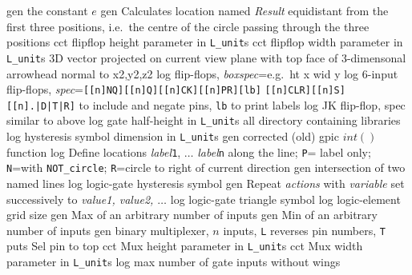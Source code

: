   {gen}
  {the constant $e$}
  {gen}
  {Calculates location named {\sl Result} equidistant from the first three
   positions, i.e.\ the centre of the circle passing through the three
   positions}
  {cct}
  {flipflop height parameter in {\tt L\_unit}s}
  {cct}
  {flipflop width parameter in {\tt L\_unit}s}
  {3D}
  {vector projected on current view plane with top face
   of 3-dimensonal arrowhead normal to x2,y2,z2 }
  {log}
  {flip-flops,
  {\sl boxspec}=e.g.\ ht x wid y}
  {log}
  {6-input flip-flops,
    {\sl spec}={\tt [[n]NQ][[n]Q][[n]CK][[n]PR][lb]}
    {\tt [[n]CLR][[n]S][[n].|D|T|R]} to include and negate pins,
    {\tt lb} to print labels }
  {log}
  {JK flip-flop, spec similar to above}
  {log}
  {gate half-height in {\tt L\_unit}s}
  {all}
  {directory containing libraries}
  {log}
  {hysteresis symbol dimension in {\tt L\_unit}s}
  {gen}
  {corrected (old) gpic $int()$ function}
  {log}
  {Define locations {\sl label}{\tt 1}, $\ldots$ {\sl label}{\tt n}
    along the line; {\tt P}= label only;
    {\tt N}=with {\tt NOT\_circle};
    {\tt R}=circle to right of current direction }
  {gen}
  {intersection of two named lines}
  {log}
  {logic-gate hysteresis symbol}
  {gen}
  {Repeat {\sl actions} with {\sl variable} set successively to
   {\sl value1, value2, $\ldots$}}
  {log}
  {logic-gate triangle symbol}
  {log}
  {logic-element grid size}
  {gen}
  {Max of an arbitrary number of inputs}
  {gen}
  {Min of an arbitrary number of inputs}
  {gen}
  {binary multiplexer, $n$ inputs,
    {\tt L} reverses pin numbers, {\tt T} puts Sel pin to top }
  {cct}
  {Mux height parameter in {\tt L\_unit}s}
  {cct}
  {Mux width parameter in {\tt L\_unit}s}
  {log}
  {max number of gate inputs without wings}
